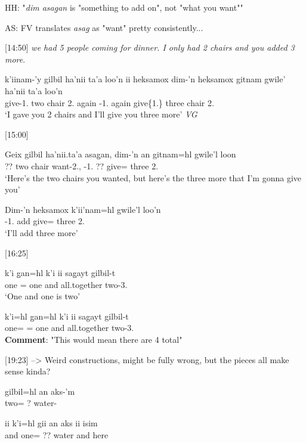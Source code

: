 HH: "\textit{dim asag̱an} is "something to add on", not "what you want""

AS: FV translates \textit{asag̱} as "want" pretty consistently... 

[14:50]
\textit{we had 5 people coming for dinner. I only had 2 chairs and you added 3 more}.
\begin{exe}
\ex \gll k'iinam-'y gilbil ha'nii ta'a loo'n  ii heksamox dim-'n heksamox gitnam gwile' ha'nii ta'a loo'n\\
give-1.\Ii{} two chair {} 2.\Prep{} \Ccnj{} again \Fut{}-1.\I{} again give\{1.\Ii{}\} three chair {} 2.\Prep{}\\
`I gave you 2 chairs and I'll give you three more' \textit{VG}
\end{exe}

[15:00]
\begin{exe}
\ex \begin{xlist}
\item \gll Geix gilbil ha'nii.ta'a asag̱an, dim-'n an gitnam=hl gwile'l loon\\
?? two chair want-2.\Ii{}, \Fut{}-1.\I{} ?? give=\Cn{} three 2.\Prep{}\\
`Here's the two chairs you wanted, but here's the three more that I'm gonna give you'
\item \gll Dim-'n heksamox k'ii'nam=hl gwile'l loo'n\\
\Fut{}-1.\I{} add give=\Cn{} three 2.\Prep{}\\
`I'll add three more'
\end{xlist}
\end{exe}

[16:25]
\begin{exe}
\ex \begin{xlist}
\item k'i g̱an=hl k'i ii sag̱ayt gilbil-t\\
 one \Pcnj{}=\Cn{} one and all.together two-3.\Ii{}\\
`One and one is two'
\item \gll k'i=hl g̱an=hl k'i ii sag̱ayt gilbil-t\\
one=\Cn{} \Pcnj{}=\Cn{} one and all.together two-3.\Ii{}\\
\textbf{Comment}: "This would mean there are 4 total"
\end{xlist}
\end{exe}

[19:23] --> Weird constructions, might be fully wrong, but the pieces all make sense kinda?
\begin{exe}
\ex \begin{xlist}
\item \gll gilbil=hl an aks-'m\\
two=\Cn{} \Ax{}? water-\Attr{}\\
\item \gll ii k'i=hl gii an aks ii isim\\
and one=\Cn{} ?? \Ax{} water and here\\
\end{xlist}
\end{exe}

